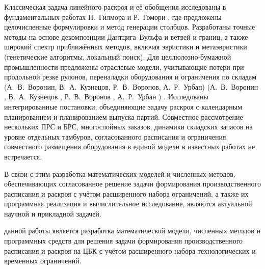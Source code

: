 Классическая задача линейного раскроя и её обобщения исследованы в фундаментальных работах П.~Гилмора и Р.~Гомори 
\ifsynopsis
\else
\cite{gilmore1961linear, gilmore1963linear}
\fi
, где предложены целочисленные формулировки и метод генерации столбцов.
Разработаны точные методы на основе декомпозиции Дантцига--Вульфа и ветвей и границ, а также широкий спектр приближённых методов, включая эвристики и метаэвристики (генетические алгоритмы, локальный поиск).
Для целлюлозно-бумажной промышленности предложены отраслевые модели, учитывающие потери при продольной резке рулонов, переналадки оборудования и ограничения по складам 
\ifsynopsis
(А.~В.~Воронин, В.~А.~Кузнецов, Р.~В.~Воронов, А.~Р.~Урбан)
\else
(А.~В.~Воронин \cite{воронин2000математические}, В.~А.~Кузнецов \cite{кузнецов2008многофункциональная}, Р.~В.~Воронов \cite{воронов2004диссертация}, А.~Р.~Урбан \cite{urban2015methods, урбан2015диссертация})
\fi
.
Исследованы интегрированные постановки, объединяющие задачу раскроя с календарным планированием и планированием выпуска партий.
Совместное рассмотрение нескольких ПРС и БРС, многослойных заказов, динамики складских запасов на уровне отдельных тамбуров, согласованного расписания и ограничения совместного размещения оборудования в единой модели в известных работах не встречается.


В связи с этим разработка математических моделей и численных методов,
обеспечивающих согласованное решение задачи формирования
производственного расписания и раскроя с учётом расширенного набора ограничений,
а также их программная реализация и вычислительное исследование,
являются актуальной научной и прикладной задачей.


{\aim} данной работы является разработка математической модели,
численных методов и программных средств для решения задачи формирования
производственного расписания и раскроя на ЦБК
с учётом расширенного набора технологических и временных ограничений.

